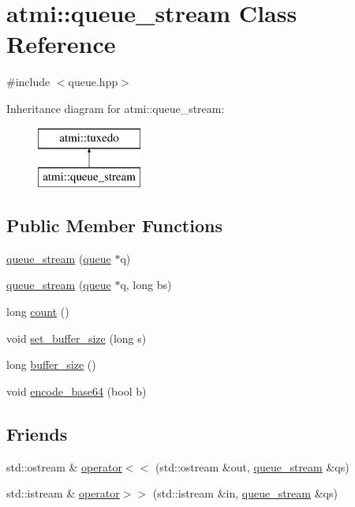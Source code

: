 \hypertarget{classatmi_1_1queue__stream}{\section{atmi\+:\+:queue\+\_\+stream Class Reference}
\label{classatmi_1_1queue__stream}
}


{\ttfamily \#include $<$queue.\+hpp$>$}

Inheritance diagram for atmi\+:\+:queue\+\_\+stream\+:\begin{figure}[H]
\begin{center}
\leavevmode
\includegraphics[height=2.000000cm]{classatmi_1_1queue__stream}
\end{center}
\end{figure}
\subsection*{Public Member Functions}
\begin{DoxyCompactItemize}
\item 
\hyperlink{classatmi_1_1queue__stream_a775623d6cd91a8a3cd40d9bb1e492c60}{queue\+\_\+stream} (\hyperlink{classatmi_1_1queue}{queue} $\ast$q)
\item 
\hyperlink{classatmi_1_1queue__stream_af05f48449db9ed2282643d9e7c148944}{queue\+\_\+stream} (\hyperlink{classatmi_1_1queue}{queue} $\ast$q, long bs)
\item 
long \hyperlink{classatmi_1_1queue__stream_ac4f1e88530a4d9fda0bc4b271301866b}{count} ()
\item 
void \hyperlink{classatmi_1_1queue__stream_a500b658e3f3f1a353982a1304ea27801}{set\+\_\+buffer\+\_\+size} (long s)
\item 
long \hyperlink{classatmi_1_1queue__stream_a18d01411c5ffeffd190195fd2b4dc61a}{buffer\+\_\+size} ()
\item 
void \hyperlink{classatmi_1_1queue__stream_a4a47e7caf329e46c31f44425e3ceb6e3}{encode\+\_\+base64} (bool b)
\end{DoxyCompactItemize}
\subsection*{Friends}
\begin{DoxyCompactItemize}
\item 
std\+::ostream \& \hyperlink{classatmi_1_1queue__stream_a8be6df3d0274f2b2090e42eda42f7301}{operator$<$$<$} (std\+::ostream \&out, \hyperlink{classatmi_1_1queue__stream}{queue\+\_\+stream} \&qs)
\item 
std\+::istream \& \hyperlink{classatmi_1_1queue__stream_a78e4b1a78a980af524e6e851c9ff4d3c}{operator$>$$>$} (std\+::istream \&in, \hyperlink{classatmi_1_1queue__stream}{queue\+\_\+stream} \&qs)
\end{DoxyCompactItemize}
